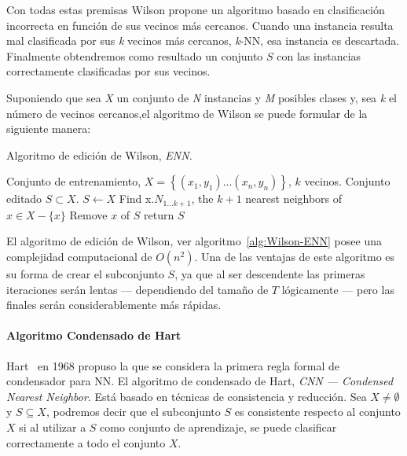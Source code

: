 Con todas estas premisas Wilson propone un algoritmo basado en clasificación incorrecta en función de sus vecinos más cercanos. Cuando una instancia resulta mal clasificada por sus \textit{k} vecinos más cercanos, \textit{k}-NN, esa instancia es descartada. Finalmente obtendremos como resultado un conjunto $S$ con las instancias correctamente clasificadas por sus vecinos.

Suponiendo que sea \textit{X} un conjunto de \textit{N} instancias y \textit{M} posibles clases y, sea \textit{k} el número de vecinos cercanos,el algoritmo de Wilson se puede formular de la siguiente manera:

\begin{algorithm}[H]
\caption{Algoritmo de edición de Wilson, \textit{ENN}.}\label{alg:Wilson-ENN}
\begin{algorithmic}[1]
\Require Conjunto de entrenamiento, $X=\left\{(x_1,y_1)...(x_n,y_n)\right\}$, $k$ vecinos.
\Ensure Conjunto editado $S \subset X$.
\Statex
{}
	\State $S\leftarrow X$
		\State Find x.$N_{1...k+1}$, the $k+1$ nearest neighbors of $x \in X - \{x\}$
			\State Remove $x$ of $S$
		\EndIf
	\EndFor
	\State return $S$
\EndProcedure
\end{algorithmic}
\end{algorithm}

El algoritmo de edición de Wilson, ver algoritmo~\ref{alg:Wilson-ENN} posee una complejidad computacional de $O(n^2)$. Una de las ventajas de este algoritmo es su forma de crear el subconjunto $S$, ya que al ser descendente las primeras iteraciones serán lentas --- dependiendo del tamaño de $T$ lógicamente --- pero las finales serán considerablemente más rápidas.


\paragraph{Algoritmo Condensado de Hart}\label{paragraph:CNN}
\hfill \break
Hart~\cite{hart1968condensed} en 1968 propuso la que se considera la primera regla formal de condensador para NN. El algoritmo de condensado de Hart, \textit{CNN --- Condensed Nearest Neighbor}. Está basado en técnicas de consistencia y reducción. Sea $X \not= \emptyset$ y $S \subseteq X$, podremos decir que el subconjunto $S$ es consistente respecto al conjunto $X$ si al utilizar a $S$ como conjunto de aprendizaje, se puede clasificar correctamente a todo el conjunto $X$.

